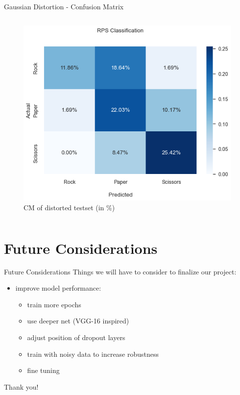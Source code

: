 \documentclass[aspectratio=169]{beamer}
\newcommand{\nologo}{\setbeamertemplate{logo}{}} %
\begin{document}
{\begin{frame}{Gaussian Distortion - Confusion Matrix}
\begin{columns}
\begin{column}{.5\textwidth}
\begin{figure}
					\includegraphics[width=1\textwidth]{img/CFM_Gauss_percent_10.png}
					\caption{CM of distorted testset (in \%)}
				\end{figure}      
			\end{column} 
		\end{columns}  
	\end{frame}

\section{Future Considerations}
	\begin{frame}{Future Considerations}
	Things we will have to consider to finalize our project:
	\begin{itemize}
		\item improve model performance:
		\begin{itemize}
			\item train more epochs
			\item use deeper net (VGG-16 inspired)
			\item adjust position of dropout layers
			\item train with noisy data to increase robustness
			\item fine tuning
		\end{itemize}

	\end{itemize}
	\end{frame}
}

\appendix
{\nologo
	\begin{frame}[standout]
		Thank you!
	\end{frame}
}
\end{document}
